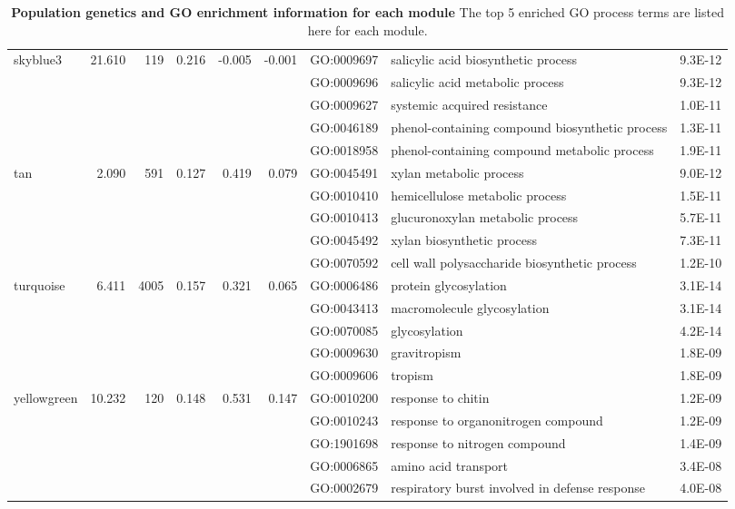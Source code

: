 \begin{landscape}
\begin{table}[ht]
\begin{tabular}{lrrrrrlP{5cm}r}
skyblue3 & 21.610 & 119 & 0.216 & -0.005 & -0.001 & GO:0009697 & salicylic acid biosynthetic process & 9.3E-12 \\ 
   &  &  &  &  &  & GO:0009696 & salicylic acid metabolic process & 9.3E-12 \\ 
   &  &  &  &  &  & GO:0009627 & systemic acquired resistance & 1.0E-11 \\ 
   &  &  &  &  &  & GO:0046189 & phenol-containing compound biosynthetic process & 1.3E-11 \\ 
   &  &  &  &  &  & GO:0018958 & phenol-containing compound metabolic process & 1.9E-11 \\ 
\hline 
 tan & 2.090 & 591 & 0.127 & 0.419 & 0.079 & GO:0045491 & xylan metabolic process & 9.0E-12 \\ 
   &  &  &  &  &  & GO:0010410 & hemicellulose metabolic process & 1.5E-11 \\ 
   &  &  &  &  &  & GO:0010413 & glucuronoxylan metabolic process & 5.7E-11 \\ 
   &  &  &  &  &  & GO:0045492 & xylan biosynthetic process & 7.3E-11 \\ 
   &  &  &  &  &  & GO:0070592 & cell wall polysaccharide biosynthetic process & 1.2E-10 \\ 
\hline  
turquoise & 6.411 & 4005 & 0.157 & 0.321 & 0.065 & GO:0006486 & protein glycosylation & 3.1E-14 \\ 
   &  &  &  &  &  & GO:0043413 & macromolecule glycosylation & 3.1E-14 \\ 
   &  &  &  &  &  & GO:0070085 & glycosylation & 4.2E-14 \\ 
   &  &  &  &  &  & GO:0009630 & gravitropism & 1.8E-09 \\ 
   &  &  &  &  &  & GO:0009606 & tropism & 1.8E-09 \\ 
\hline 
 yellowgreen & 10.232 & 120 & 0.148 & 0.531 & 0.147 & GO:0010200 & response to chitin & 1.2E-09 \\ 
   &  &  &  &  &  & GO:0010243 & response to organonitrogen compound & 1.2E-09 \\ 
   &  &  &  &  &  & GO:1901698 & response to nitrogen compound & 1.4E-09 \\ 
   &  &  &  &  &  & GO:0006865 & amino acid transport & 3.4E-08 \\ 
   &  &  &  &  &  & GO:0002679 & respiratory burst involved in defense response & 4.0E-08 \\ 
   \hline
\end{tabular}
\caption{\textbf{Population genetics and GO enrichment information for each module} The top 5 enriched GO process terms are listed here for each module.}
\label{table:t1}
\end{table}

\end{landscape}

